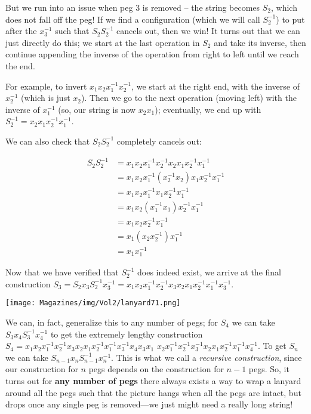 \documentclass{article}
\begin{document}
\begin{multicols}{3}
But we run into an issue when peg 3 is removed -- the string becomes $S_2$, which does not fall off the peg! If we find a configuration (which we will call $S_2^{-1}$) to put after the $x_3^{-1}$ such that $S_2S_2^{-1}$ cancels out, then we win! 
It turns out that we can just directly do this; we start at the last operation in $S_2$ and take its inverse, then continue appending the inverse of the operation from right to left until we reach the end.

For example, to invert $x_1x_2x_1^{-1}x_2^{-1}$, we start at the right end, with the inverse of $x_2^{-1}$ (which is just $x_2$). Then we go to the next operation (moving left) with the inverse of $x_1^{-1}$ (so, our string is now $x_2x_1$); eventually, we end up with $S_2^{-1}=x_2x_1x_2^{-1}x_1^{-1}$. 

We can also check that $S_2S_2^{-1}$ completely cancels out:

\begin{align*}
	S_2S_2^{-1}&= x_1x_2x_1^{-1}x_2^{-1}x_2x_1x_2^{-1}x_1^{-1} \\
	&= x_1x_2x_1^{-1}(x_2^{-1}x_2)x_1x_2^{-1}x_1^{-1} \\
	&= x_1x_2x_1^{-1}x_1x_2^{-1}x_1^{-1} \\
	&= x_1x_2(x_1^{-1}x_1)x_2^{-1}x_1^{-1} \\
	&= x_1x_2x_2^{-1}x_1^{-1} \\
	&= x_1(x_2x_2^{-1})x_1^{-1} \\
	&= x_1x_1^{-1}
\end{align*}

Now that we have verified that $S_2^{-1}$ does indeed exist, we arrive at the final construction $S_3=S_2x_3S_2^{-1}x_3^{-1}=x_1x_2x_1^{-1}x_2^{-1}x_3x_2x_1x_2^{-1}x_1^{-1}x_3^{-1}$.

\begin{center}
    \texttt{[image: Magazines/img/Vol2/lanyard71.png]}
\end{center}

We can, in fact, generalize this to any number of pegs; for $S_4$ we can take $S_3x_4S_3^{-1}x_4^{-1}$ to get the extremely lengthy construction
$S_4=x_1x_2x_1^{-1}x_2^{-1}x_3x_2x_1x_2^{-1}x_1^{-1}x_3^{-1}x_4x_3x_1$ $x_2x_1^{-1}x_2^{-1}x_3^{-1}x_2x_1x_2^{-1}x_1^{-1}x_4^{-1}$. To get $S_n$ we can take $S_{n-1}x_nS_{n-1}^{-1}x_n^{-1}$. This is what we call a \textit{recursive construction}, since our construction for $n$ pegs depends on the construction for $n-1$ pegs. 
So, it turns out for \textbf{any number of pegs} there always exists a way to wrap a lanyard around all the pegs such that the picture hangs when all the pegs are intact, but drops once any single peg is removed---we just might need a really long string!


\end{multicols}
\end{document}
